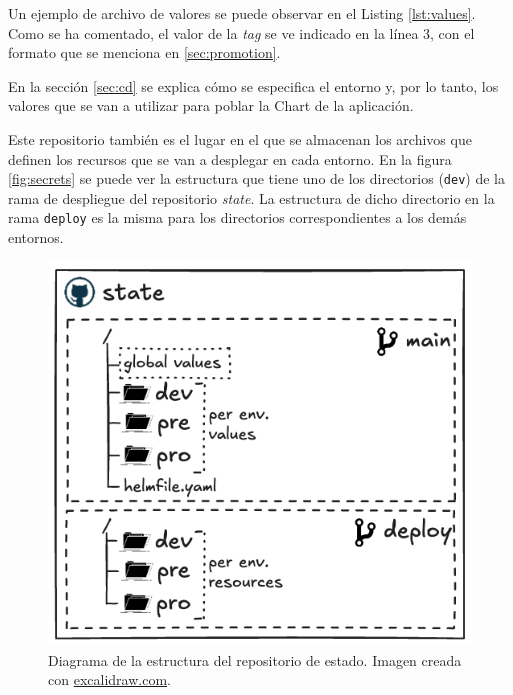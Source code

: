 Un ejemplo de archivo de valores se puede observar en el Listing \ref{lst:values}. Como se ha comentado, el valor de la \textit{tag} se ve indicado en la línea 3, con el formato que se menciona en \ref{sec:promotion}.

En la sección \ref{sec:cd} se explica cómo se especifica el entorno y, por lo tanto, los valores que se van a utilizar para poblar la Chart de la aplicación.

Este repositorio también es el lugar en el que se almacenan los archivos que definen los recursos que se van a desplegar en cada entorno. En la figura \ref{fig:secrets} se puede ver la estructura que tiene uno de los directorios (\texttt{dev}) de la rama de despliegue del repositorio \textit{state}. La estructura de dicho directorio en la rama \texttt{deploy} es la misma para los directorios correspondientes a los demás entornos.

\begin{figure}
  \centerline{\includegraphics[width=12cm]{figuras/state}}
  \caption{Diagrama de la estructura del repositorio de estado. Imagen creada con \href{https://excalidraw.com}{excalidraw.com}.}
  \label{fig:state}
\end{figure}

